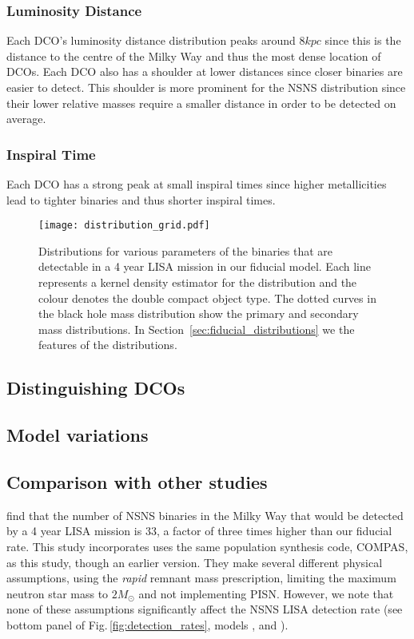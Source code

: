 \subsubsection{Luminosity Distance}
Each DCO's luminosity distance distribution peaks around $8 \unit{kpc}$ since this is the distance to the centre of the Milky Way and thus the most dense location of DCOs. Each DCO also has a shoulder at lower distances since closer binaries are easier to detect. This shoulder is more prominent for the NSNS distribution since their lower relative masses require a smaller distance in order to be detected on average.

\subsubsection{Inspiral Time}
Each DCO has a strong peak at small inspiral times since higher metallicities lead to tighter binaries and thus shorter inspiral times. 

\begin{figure*}[htbp]
    \centering
    \texttt{[image: distribution\_grid.pdf]}
    \caption{Distributions for various parameters of the binaries that are detectable in a 4 year LISA mission in our fiducial model. Each line represents a kernel density estimator for the distribution and the colour denotes the double compact object type. The dotted curves in the black hole mass distribution show the primary and secondary mass distributions. In Section~\ref{sec:fiducial_distributions} we the features of the distributions.}
    \label{fig:fiducial_pdf_distributions}
\end{figure*}

\subsection{Distinguishing DCOs}
\todo{}

\subsection{Model variations}


\subsection{Comparison with other studies}\label{sec:compare_studies}
\citet{Lau+2020} find that the number of NSNS binaries in the Milky Way that would be detected by a 4 year LISA mission is 33, a factor of three times higher than our fiducial rate. This study incorporates \citet{Lau+2020} uses the same population synthesis code, COMPAS, as this study, though an earlier version. They make several different physical assumptions, using the \citet{Fryer+2012} \textit{rapid} remnant mass prescription, limiting the maximum neutron star mass to $2 \unit{M_{\odot}}$ and not implementing PISN. However, we note that none of these assumptions significantly affect the NSNS LISA detection rate (see bottom panel of Fig.\,\ref{fig:detection_rates}, models \modRapid{}, \modNSLow{} and \modNoPISN{}).

